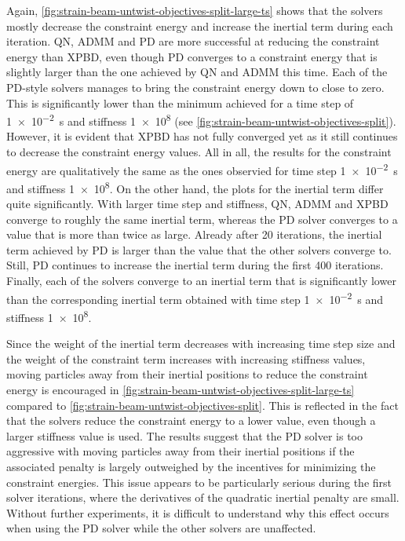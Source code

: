 Again, \autoref{fig:strain-beam-untwist-objectives-split-large-ts} shows that the solvers mostly decrease the constraint energy and increase the inertial term during each 
iteration. QN, ADMM and PD are more successful at reducing the constraint energy than XPBD, even 
though PD converges to a constraint energy that is slightly larger than the one achieved by QN and ADMM this time. Each of the PD-style solvers manages to bring the 
constraint energy down to close to zero. This is significantly lower than the minimum achieved for a time step of \SI{1e-2}{\second} and stiffness \num{1e8} (see 
\cref{fig:strain-beam-untwist-objectives-split}). However, it is evident that XPBD has not fully converged yet as it still continues to decrease the constraint energy 
values. All in all, the results for the constraint energy are qualitatively the same as the ones observied for 
time step \SI{1e-2}{\second} and stiffness \num{1e8}. On the other hand, the plots for the inertial term differ quite significantly. With larger time step and stiffness,
QN, ADMM and XPBD converge to roughly the same inertial term, whereas the PD solver converges to a value that is more than twice as large. Already after 20 iterations, 
the inertial term achieved by PD is larger than the value that the other solvers converge to. Still, PD continues to increase the inertial term during the first 400 
iterations. Finally, each of the solvers converge to an inertial term that is significantly lower than the corresponding inertial term obtained with time step 
\SI{1e-2}{\second} and stiffness \num{1e8}.

Since the weight of the inertial term decreases with increasing time step size and the weight of the constraint term increases with increasing stiffness values, moving 
particles away from their inertial positions to reduce the constraint energy is encouraged in \autoref{fig:strain-beam-untwist-objectives-split-large-ts} compared to
\autoref{fig:strain-beam-untwist-objectives-split}. This is reflected in the fact that the solvers reduce the constraint energy to a lower value, even though a larger 
stiffness value is used. The results suggest that the PD solver is too aggressive with moving particles away from their inertial positions if the associated penalty 
is largely outweighed by the incentives for minimizing the constraint energies. This issue 
appears to be particularly serious during the first solver iterations, where the derivatives of the quadratic inertial penalty are small. 
Without further experiments, it is difficult to understand why this effect occurs when using the PD solver while the other solvers are unaffected.


